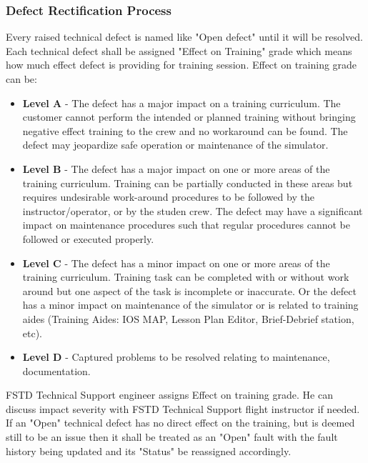         \subsubsection{Defect Rectification Process}
            Every raised technical defect is named like "Open defect" until it will be resolved. Each technical defect shall be assigned "Effect on Training" 
            grade which means how much effect defect is providing for training session. Effect on training grade can be:
            \begin{itemize}
                \item \textbf{Level A} - The defect has a major impact on a training curriculum. The customer cannot perform the intended or planned training without 
                bringing negative effect training to the crew and no workaround can be found. The defect may jeopardize safe operation or maintenance of the 
                simulator. 
                \item \textbf{Level B} - The defect has a major impact on one or more areas of the training curriculum. Training can be partially conducted in these 
                areas but requires undesirable work-around procedures to be followed by the instructor/operator, or by the studen crew. The defect may have 
                a significant impact on maintenance procedures such that regular procedures cannot be followed or executed properly. 
                \item \textbf{Level C} - The defect has a minor impact on one or more areas of the training curriculum. Training task can be completed with or without 
                work around but one aspect of the task is incomplete or inaccurate. Or the defect has a minor impact on maintenance of the simulator or is 
                related to training aides (Training Aides: IOS MAP, Lesson Plan Editor, Brief-Debrief station, etc).
                \item \textbf{Level D} - Captured problems to be resolved relating to maintenance, documentation.
            \end{itemize}
            FSTD Technical Support engineer assigns Effect on training grade. He can discuss impact severity with FSTD Technical Support flight instructor if 
            needed. \\
            \vspace{3mm}
            If an "Open" technical defect has no direct effect on the training, but is deemed still to be an issue then it shall be treated as an "Open" fault 
            with the fault history being updated and its "Status" be reassigned accordingly. \\ 
